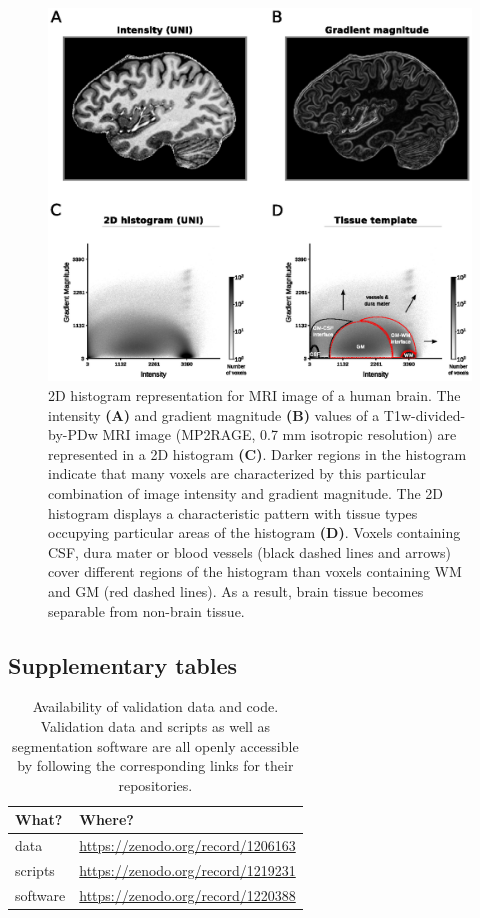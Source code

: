 \begin{figure}[htbp!]
\centering
\includegraphics[width=\textwidth]{figures/chapter_02_SI/figure_1b.eps}
\caption{2D histogram representation for MRI image of a human brain. The intensity \textbf{(A)} and gradient magnitude \textbf{(B)} values of a T1w-divided-by-PDw MRI image (MP2RAGE, 0.7 mm isotropic resolution) are represented in a 2D histogram \textbf{(C)}. Darker regions in the histogram indicate that many voxels are characterized by this particular combination of image intensity and gradient magnitude. The 2D histogram displays a characteristic pattern with tissue types occupying particular areas of the histogram \textbf{(D)}. Voxels containing CSF, dura mater or blood vessels (black dashed lines and arrows) cover different regions of the histogram than voxels containing WM and GM (red dashed lines). As a result, brain tissue becomes separable from non-brain tissue.}
\label{fig:S07_Fig}
\end{figure}

\clearpage
\subsection{Supplementary tables}

\begin{table}[htb!]
\centering
\caption{Availability of validation data and code. Validation data and scripts as well as segmentation software are all openly accessible by following the corresponding links for their repositories.}
\begin{tabular}{ll}
\\
\toprule
What? & Where? \\
\midrule
data & \url{https://zenodo.org/record/1206163}\\
scripts & \url{https://zenodo.org/record/1219231}\\
software & \url{https://zenodo.org/record/1220388}\\
\bottomrule
\end{tabular}
\label{tab:availability}
\end{table}

